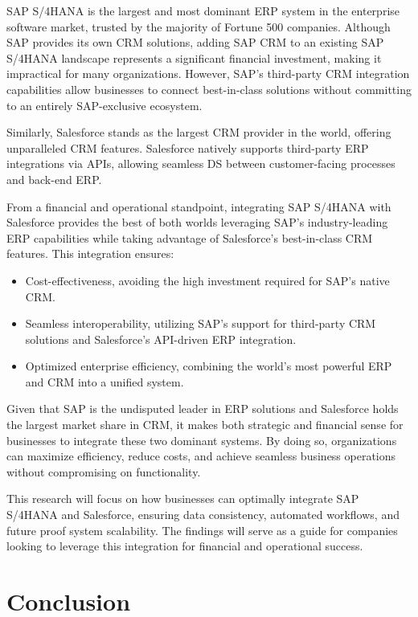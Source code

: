 SAP S/4HANA is the largest and most dominant ERP system in the enterprise software market, trusted by the majority of Fortune 500 companies. Although SAP provides its own CRM solutions, adding SAP CRM to an existing SAP S/4HANA landscape represents a significant financial investment, making it impractical for many organizations. However, SAP's third-party CRM integration capabilities allow businesses to connect best-in-class solutions without committing to an entirely SAP-exclusive ecosystem.

Similarly, Salesforce stands as the largest CRM provider in the world, offering unparalleled CRM features. Salesforce natively supports third-party ERP integrations via APIs, allowing seamless DS between customer-facing processes and back-end ERP.

From a financial and operational standpoint, integrating SAP S/4HANA with Salesforce provides the best of both worlds leveraging SAP’s industry-leading ERP capabilities while taking advantage of Salesforce’s best-in-class CRM features. This integration ensures:
\begin{itemize}
    \item Cost-effectiveness, avoiding the high investment required for SAP's native CRM.
    \item Seamless interoperability, utilizing SAP’s support for third-party CRM solutions and Salesforce’s API-driven ERP integration.
    \item Optimized enterprise efficiency, combining the world’s most powerful ERP and CRM into a unified system.
\end{itemize}

Given that SAP is the undisputed leader in ERP solutions and Salesforce holds the largest market share in CRM, it makes both strategic and financial sense for businesses to integrate these two dominant systems. By doing so, organizations can maximize efficiency, reduce costs, and achieve seamless business operations without compromising on functionality.

This research will focus on how businesses can optimally integrate SAP S/4HANA and Salesforce, ensuring data consistency, automated workflows, and future proof system scalability. The findings will serve as a guide for companies looking to leverage this integration for financial and operational success.



\section{Conclusion}


